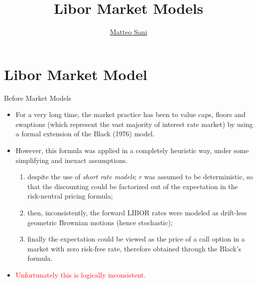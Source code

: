 \documentclass{beamer}
\title{Libor Market Models}
\author{\href{mailto:matteo.sani@unisi.it}{Matteo Sani}}
\begin{document}
\begin{frame}[plain]
  \maketitle
\end{frame}

\section{Libor Market Model}
\begin{frame}{Before Market Models}
  \begin{itemize}
  \item<1-> For a very long time, the market practice has been to value caps, floors and swaptions (which represent the vast majority of interest rate market) by using a formal extension of the Black (1976) model. 
  \item<2-> However, this formula was applied in a completely heuristic way, under some simplifying and inexact assumptions.
    \begin{enumerate}
    \item<3-> despite the use of \emph{short rate models}; $r$ was assumed to be deterministic, so that the discounting could be factorized out of the expectation in the risk-neutral pricing formula; 
    \item<4-> then, inconsistently, the forward LIBOR rates were modeled as drift-less geometric Brownian motions (hence stochastic);
    \item<5-> finally the expectation could be viewed as the price of a call option in a market with zero risk-free rate, therefore obtained through the Black’s formula.
    \end{enumerate} 
  \item<6-> \textcolor{red}{Unfortunately this is logically inconsistent.}
  \end{itemize}
\end{frame}
\end{document}
